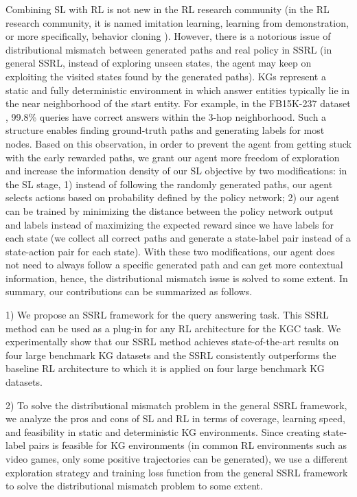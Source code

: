 \documentclass[lettersize,journal]{IEEEtran}
\begin{document}
Combining SL with RL is not new in the RL research community (in the RL research community, it is named imitation learning, learning from demonstration, or more specifically, behavior cloning \cite{ravichandar2020recent}). However, there is a notorious issue of distributional mismatch between generated paths and real policy in SSRL (in general SSRL, instead of exploring unseen states, the agent may keep on exploiting the visited states found by the generated paths). KGs represent a static and fully deterministic environment in which answer entities typically lie in the near neighborhood of the start entity. For example, in the FB15K-237 dataset \cite{toutanova-etal-2015-representing}, 99.8\% queries have correct answers within the 3-hop neighborhood. Such a structure enables finding ground-truth paths and generating labels for most nodes. Based on this observation, in order to prevent the agent from getting stuck with the early rewarded paths, we grant our agent more freedom of exploration and increase the information density of our SL objective by two modifications: in the SL stage, 1) instead of following the randomly generated paths, our agent selects actions based on probability defined by the policy network; 2) our agent can be trained by minimizing the distance between the policy network output and labels instead of maximizing the expected reward since we have labels for each state (we collect all correct paths and generate a state-label pair instead of a state-action pair for each state). With these two modifications, our agent does not need to always follow a specific generated path and can get more contextual information, hence, the distributional mismatch issue is solved to some extent. In summary, our contributions can be summarized as follows.

1) We propose an SSRL framework for the query answering task. This SSRL method can be used as a plug-in for any RL architecture for the KGC task. We experimentally show that our SSRL method achieves state-of-the-art results on four large benchmark KG datasets and the SSRL consistently outperforms the baseline RL architecture to which it is applied on four large benchmark KG datasets. 

2) To solve the distributional mismatch problem in the general SSRL framework, we analyze the pros and cons of SL and RL in terms of
coverage, learning speed, and feasibility in static and deterministic KG environments. Since creating state-label pairs is feasible for KG environments (in common RL environments such as video games, only some positive trajectories can be generated), 
we use a different exploration strategy and training loss function from the general SSRL framework to solve the distributional mismatch problem to some extent. 
\end{document}
